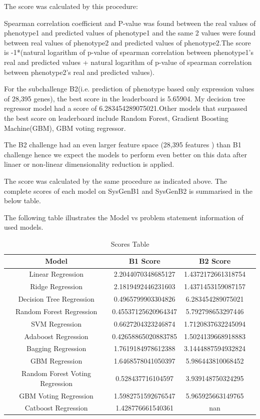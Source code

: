 \documentclass{ifacconf}
\begin{document}
The score was calculated by this procedure:

Spearman correlation coefficient and P-value was found between the real values of phenotype1 and predicted values of phenotype1 and the same 2 values were found between real values of phenotype2 and predicted values of phenotype2.The score is -1*(natural logarithm of p-value of spearman correlation between phenotype1's real and predicted values + natural logarithm of p-value of spearman correlation between phenotype2's real and predicted values).

For the subchallenge B2(i.e. prediction of phenotype based only expression values of 28,395 genes), the best score in the leaderboard is 5.65904. My decision tree regressor model had a score of 6.283454289075021.Other models that surpassed the best score on leaderboard include Random Forest, Gradient Boosting Machine(GBM), GBM voting regressor.

The B2 challenge had an even larger feature space (28,395 features ) than B1 challenge hence we expect the models to perform even better on this data after linaer or non-linear dimensionality reduction is applied.

The score was calculated by the same procedure as indicated above.
The complete scores of each model on SysGenB1 and SysGenB2 is summarised in the below table. 

The following table illustrates the Model vs problem statement information of used models.

\begin{table}[hb]
\begin{center}
\caption{Scores Table}\label{tb:margins}
\begin{tabular}{cccc}
Model & B1 Score & B2 Score  \\\hline
Linear Regression & 2.2044070348685127 & 1.4372172661318754  \\
Ridge Regression & 2.1819492446231603 & 1.4371453159087157  \\
Decision Tree Regression & 0.4965799903304826 & 6.283454289075021 \\ 
Random Forest Regression & 0.45537125620964347 & 5.792798653297446  \\
SVM Regression & 0.6627204323246874 & 1.7120837632245094  \\
Adaboost Regression & 0.42658865020883785 & 1.5024139668918883  \\
Bagging Regression & 1.7619184978612388 & 3.1444887594932824  \\
GBM Regression & 1.6468578041050397 & 5.986443810068452  \\
Random Forest Voting Regression & 0.528437716104597 & 3.939148750324295  \\
GBM Voting Regression & 1.5982751592676547
& 5.965925663149765  \\
Catboost Regression & 1.428776661540361
& nan  \\\hline
\end{tabular}
\end{center}
\end{table}
\end{document}
